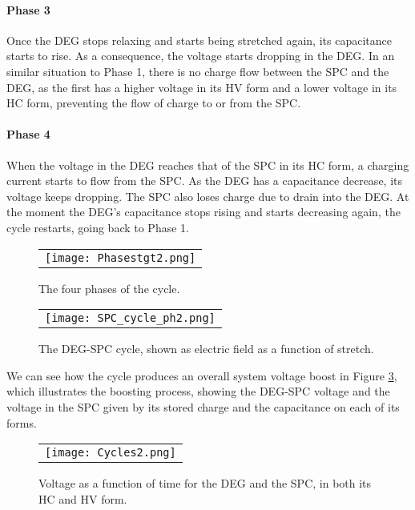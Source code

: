 \paragraph{Phase 3} Once the DEG stops relaxing and starts being stretched again, its capacitance starts to rise. As a consequence, the voltage starts dropping in the DEG. In an similar situation to Phase 1, there is no charge flow between the SPC and the DEG, as the first has a higher voltage in its HV form and a lower voltage in its HC form, preventing the flow of charge to or from the SPC.
\paragraph{Phase 4} When the voltage in the DEG reaches that of the SPC in its HC form, a charging current starts to flow from the SPC. As the DEG has a capacitance decrease, its voltage keeps dropping. The SPC also loses charge due to drain into the DEG. At the moment the DEG's capacitance stops rising and starts decreasing again, the cycle restarts, going back to Phase 1.


\begin{figure}[ht]
\begin{center}
\begin{tabular}{c}
\texttt{[image: Phasestgt2.png]}
\end{tabular}
\end{center}
\caption 
{ \label{fig:cycleph}
The four phases of the cycle.} 
\end{figure}

\begin{figure}[ht]
\begin{center}
\begin{tabular}{c}
\texttt{[image: SPC\_cycle\_ph2.png]}\\
\end{tabular}
\end{center}
\caption 
{ \label{fig:SPCcycle}
The DEG-SPC cycle, shown as electric field as a function of stretch.} 
\end{figure}

We can see how the cycle produces an overall system voltage boost in Figure \ref{fig:cycles}, which illustrates the boosting process, showing the DEG-SPC voltage and the voltage in the SPC given by its stored charge and the capacitance on each of its forms. 

\begin{figure}[ht]
\begin{center}
\begin{tabular}{c}
\texttt{[image: Cycles2.png]}\\
\end{tabular}
\end{center}
\caption 
{ \label{fig:cycles}
Voltage as a function of time for the DEG and the SPC, in both its HC and HV form.} 
\end{figure}


